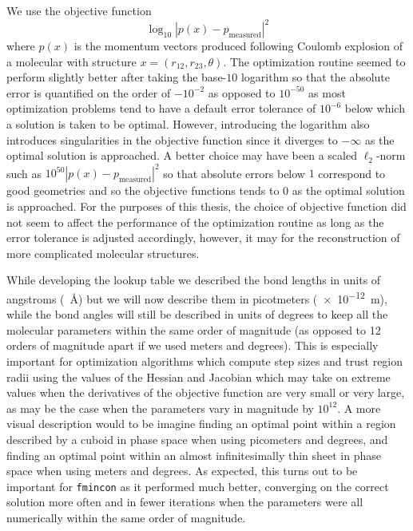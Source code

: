 We use the objective function
\begin{equation}
\log_{10}|p(x)-p_\textrm{measured}|^2
\end{equation}
where $p(x)$ is the momentum vectors produced following Coulomb explosion of a molecular with structure $x = (r_{12}, r_{23}, \theta)$. The optimization routine seemed to perform slightly better after taking the base-$10$ logarithm so that the absolute error is quantified on the order of $-10^{-2}$ as opposed to $10^{-50}$ as most optimization problems tend to have a default error tolerance of $10^{-6}$ below which a solution is taken to be optimal. However, introducing the logarithm also introduces singularities in the objective function since it diverges to $-\infty$ as the optimal solution is approached. A better choice may have been a scaled $\ell_2$-norm such as $10^{50}|p(x)-p_\textrm{measured}|^2$ so that absolute errors below $1$ correspond to good geometries and so the objective functions tends to $0$ as the optimal solution is approached. For the purposes of this thesis, the choice of objective function did not seem to affect the performance of the optimization routine as long as the error tolerance is adjusted accordingly, however, it may for the reconstruction of more complicated molecular structures.

While developing the lookup table we described the bond lengths in units of angstroms (\SI{}{\angstrom}) but we will now describe them in picotmeters (\SI{e-12}{\m}), while the bond angles will still be described in units of degrees to keep all the molecular parameters within the same order of magnitude (as opposed to 12 orders of magnitude apart if we used meters and degrees). This is especially important for optimization algorithms which compute step sizes and trust region radii using the values of the Hessian and Jacobian which may take on extreme values when the derivatives of the objective function are very small or very large, as may be the case when the parameters vary in magnitude by $10^{12}$. A more visual description would to be imagine finding an optimal point within a region described by a cuboid in phase space when using picometers and degrees, and finding an optimal point within an almost infinitesimally thin sheet in phase space when using meters and degrees. As expected, this turns out to be important for \texttt{fmincon} as it performed much better, converging on the correct solution more often and in fewer iterations when the parameters were all numerically within the same order of magnitude.


